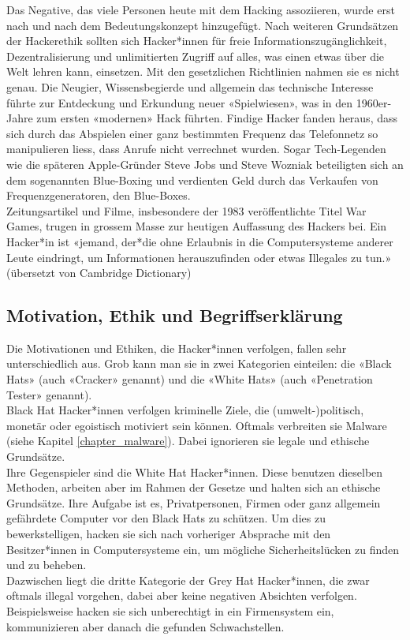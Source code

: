 \documentclass[12pt, a4paper]{article}
\begin{document}
Das Negative, das viele Personen heute mit dem Hacking assoziieren, wurde erst nach und nach dem Bedeutungskonzept hinzugefügt. Nach weiteren Grundsätzen der Hackerethik sollten sich Hacker*innen für freie Informationszugänglichkeit, Dezentralisierung und unlimitierten Zugriff auf alles, was einen etwas über die Welt lehren kann, einsetzen. Mit den gesetzlichen Richtlinien nahmen sie es nicht genau. Die Neugier, Wissensbegierde und allgemein das technische Interesse führte zur Entdeckung und Erkundung neuer «Spielwiesen», was in den 1960er-Jahre zum ersten «modernen» Hack führten. Findige Hacker fanden heraus, dass sich durch das Abspielen einer ganz bestimmten Frequenz das Telefonnetz so manipulieren liess, dass Anrufe nicht verrechnet wurden. Sogar Tech-Legenden wie die späteren Apple-Gründer Steve Jobs und Steve Wozniak beteiligten sich an dem sogenannten Blue-Boxing und verdienten Geld durch das Verkaufen von Frequenzgeneratoren, den Blue-Boxes. \\Zeitungsartikel und Filme, insbesondere der 1983 veröffentlichte Titel War Games, trugen in grossem Masse zur heutigen Auffassung des Hackers bei.  Ein Hacker*in ist «jemand, der*die ohne Erlaubnis in die Computersysteme anderer Leute eindringt, um Informationen herauszufinden oder etwas Illegales zu tun.» (übersetzt von Cambridge Dictionary) \cite{bpbKleineGeschichte:online, CambridgeHacker:online}

\subsection{Motivation, Ethik und Begriffserklärung}
Die Motivationen und Ethiken, die Hacker*innen verfolgen, fallen sehr unterschiedlich aus. Grob kann man sie in zwei Kategorien einteilen: die «Black Hats» (auch «Cracker» genannt) und die «White Hats» (auch «Penetration Tester» genannt). \\Black Hat Hacker*innen verfolgen kriminelle Ziele, die (umwelt-)politisch, monetär oder egoistisch motiviert sein können. Oftmals verbreiten sie Malware (siehe Kapitel \ref{chapter_malware}). Dabei ignorieren sie legale und ethische Grundsätze. \\Ihre Gegenspieler sind die White Hat Hacker*innen. Diese benutzen dieselben Methoden, arbeiten aber im Rahmen der Gesetze und halten sich an ethische Grundsätze. Ihre Aufgabe ist es, Privatpersonen, Firmen oder ganz allgemein gefährdete Computer vor den Black Hats zu schützen. Um dies zu bewerkstelligen, hacken sie sich nach vorheriger Absprache mit den Besitzer*innen in Computersysteme ein, um mögliche Sicherheitslücken zu finden und zu beheben. \\Dazwischen liegt die dritte Kategorie der Grey Hat Hacker*innen, die zwar oftmals illegal vorgehen, dabei aber keine negativen Absichten verfolgen. Beispielsweise hacken sie sich unberechtigt in ein Firmensystem ein, kommunizieren aber danach die gefunden Schwachstellen. \cite{WhiteHatBlackHat:paper, BlackHat34:online}
\end{document}
